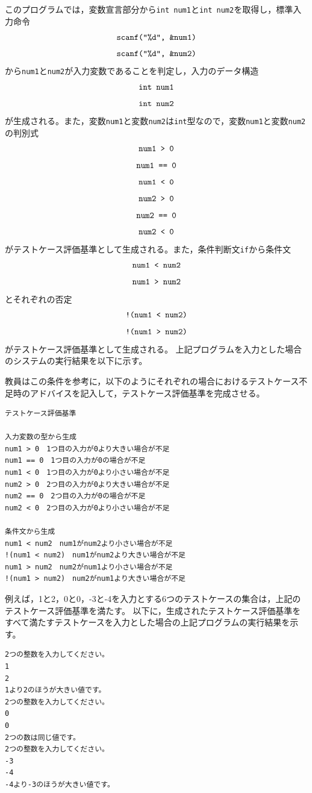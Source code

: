 \documentclass{tpu-sotu}
\begin{document}

このプログラムでは，変数宣言部分から{\tt int num1}と{\tt int num2}を取得し，標準入力命令\\
\[ 
\mbox{{\tt {scanf("\%d", \&num1)}}}
\]
\[ 
\mbox{{\tt {scanf("\%d", \&num2)}}}
\]
から{\tt num1}と{\tt num2}が入力変数であることを判定し，入力のデータ構造\\
\[
\mbox{{\tt int num1}}
\]
\[
\mbox{{\tt int num2}}
\]
が生成される。また，変数{\tt num1}と変数{\tt num2}は{\tt int}型なので，変数{\tt num1}と変数{\tt num2}の判別式\\
\[ 
\mbox{\tt{num1 > 0}} 
\]
\[
\mbox{\tt{num1 == 0}}
\]
\[
\mbox{\tt{num1 < 0}}
\]
\[ 
\mbox{\tt{num2 > 0}} 
\]
\[
\mbox{\tt{num2 == 0}}
\]
\[
\mbox{\tt{num2 < 0}}
\]
がテストケース評価基準として生成される。また，条件判断文{\tt if}から条件文\\
\[
\mbox{\tt{num1 < num2}}
\]
\[
\mbox{\tt{num1 > num2}}
\]
とそれぞれの否定\\
\[
\mbox{\tt{!(num1 < num2)}}
\]
\[
\mbox{\tt{!(num1 > num2)}}
\]
がテストケース評価基準として生成される。
上記プログラムを入力とした場合のシステムの実行結果を以下に示す。

教員はこの条件を参考に，以下のようにそれぞれの場合におけるテストケース不足時のアドバイスを記入して，テストケース評価基準を完成させる。
\begin{lstlisting}[xleftmargin=1cm]
テストケース評価基準

入力変数の型から生成
num1 > 0　1つ目の入力が0より大きい場合が不足
num1 == 0　1つ目の入力が0の場合が不足
num1 < 0　1つ目の入力が0より小さい場合が不足
num2 > 0　2つ目の入力が0より大きい場合が不足
num2 == 0　2つ目の入力が0の場合が不足
num2 < 0　2つ目の入力が0より小さい場合が不足

条件文から生成
num1 < num2　num1がnum2より小さい場合が不足
!(num1 < num2)　num1がnum2より大きい場合が不足
num1 > num2　num2がnum1より小さい場合が不足
!(num1 > num2)　num2がnum1より大きい場合が不足
\end{lstlisting}
例えば，1と2，0と0，-3と-4を入力とする6つのテストケースの集合は，上記のテストケース評価基準を満たす。
以下に，生成されたテストケース評価基準をすべて満たすテストケースを入力とした場合の上記プログラムの実行結果を示す。
\begin{lstlisting}[xleftmargin=1cm]
2つの整数を入力してください。
1
2
1より2のほうが大きい値です。
2つの整数を入力してください。
0
0
2つの数は同じ値です。
2つの整数を入力してください。
-3
-4
-4より-3のほうが大きい値です。

\end{lstlisting}
\end{document}
